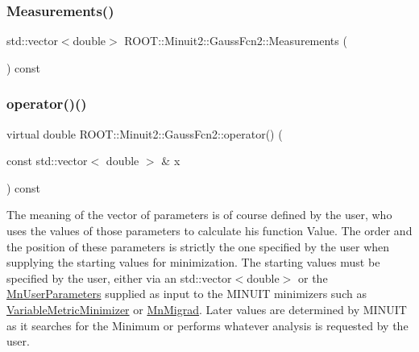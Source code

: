 \subsubsection{\texorpdfstring{Measurements()}{Measurements()}\hspace{0.1cm}{\footnotesize\ttfamily [2/2]}}
{\footnotesize\ttfamily std\+::vector$<$double$>$ R\+O\+O\+T\+::\+Minuit2\+::\+Gauss\+Fcn2\+::\+Measurements (\begin{DoxyParamCaption}{ }\end{DoxyParamCaption}) const\hspace{0.3cm}{\ttfamily [inline]}}

\mbox{\label{classROOT_1_1Minuit2_1_1GaussFcn2_a1d9f5a8eb73400d54aea80d6dfd2ed37}} 
\subsubsection{\texorpdfstring{operator()()}{operator()()}\hspace{0.1cm}{\footnotesize\ttfamily [1/2]}}
{\footnotesize\ttfamily virtual double R\+O\+O\+T\+::\+Minuit2\+::\+Gauss\+Fcn2\+::operator() (\begin{DoxyParamCaption}\item[{const std\+::vector$<$ double $>$ \&}]{x }\end{DoxyParamCaption}) const\hspace{0.3cm}{\ttfamily [virtual]}}

The meaning of the vector of parameters is of course defined by the user, who uses the values of those parameters to calculate his function Value. The order and the position of these parameters is strictly the one specified by the user when supplying the starting values for minimization. The starting values must be specified by the user, either via an std\+::vector$<$double$>$ or the \mbox{\hyperlink{classROOT_1_1Minuit2_1_1MnUserParameters}{Mn\+User\+Parameters}} supplied as input to the M\+I\+N\+U\+IT minimizers such as \mbox{\hyperlink{classROOT_1_1Minuit2_1_1VariableMetricMinimizer}{Variable\+Metric\+Minimizer}} or \mbox{\hyperlink{classROOT_1_1Minuit2_1_1MnMigrad}{Mn\+Migrad}}. Later values are determined by M\+I\+N\+U\+IT as it searches for the Minimum or performs whatever analysis is requested by the user.


